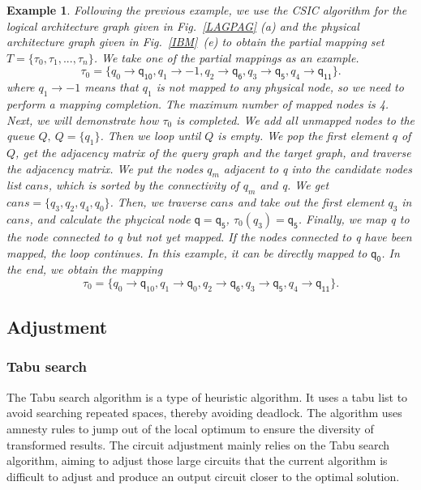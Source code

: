 \documentclass[journal]{IEEEtran}
\newtheorem{example}{Example}
\begin{document}
	\begin{example}
		Following the previous example, we use the CSIC algorithm for the logical architecture graph given in Fig.~\ref{LAGPAG} (a) and the physical architecture graph given in Fig.~\ref{IBM}~(e) to obtain the partial mapping set $T=\{\tau_{0},\tau_{1},...,\tau_{n}\}$. We take one of the partial mappings as an example.
		$$\tau_{0}=\{\textit{q}_\textit{0}\rightarrow \textsf{q}_{\textsf{10}},\textit{q}_\textit{1}\rightarrow -1,
		\textit{q}_\textit{2}\rightarrow \textsf{q}_{\textsf{6}},\textit{q}_\textit{3}\rightarrow \textsf{q}_{\textsf{5}},\textit{q}_\textit{4}\rightarrow \textsf{q}_{\textsf{11}}\}. $$ 
		where $\textit{q}_\textit{1}\rightarrow -1$ means that $\textit{q}_\textit{1}$ is not mapped to any physical node, so we need to perform a mapping completion. The maximum number of mapped nodes is 4. Next, we will demonstrate how $\tau_{0}$ is completed. We add all unmapped nodes to the queue $Q, \ Q=\{\textit{q}_\textit{1}\}$. Then we loop until $Q$ is empty. We pop the first element $q$ of $Q$, get the adjacency matrix of the query graph and the target graph, and traverse the adjacency matrix. We put the nodes  $\textit{q}_\textit{m}$ adjacent to \textit{q} into the candidate nodes list $cans$, which is sorted by the connectivity of $\textit{q}_\textit{m}$ and \textit{q}. We get $cans=\{\textit{q}_\textit{3},\textit{q}_\textit{2},\textit{q}_\textit{4},\textit{q}_\textit{0}\}$. Then, we traverse $cans$ and take out  the first element $\textit{q}_\textit{3}$ in $cans$, and calculate the phycical node $\textsf{q}=\textsf{q}_{\textsf{5}}$, $\tau_0(\textit{q}_\textit{3})=\textsf{q}_{\textsf{5}}$. Finally, we map \textit{q} to the node connected to \textsf{q} but not yet mapped. If the nodes connected to \textsf{q} have been mapped, the loop continues. In this example, it can be directly mapped to $\textsf{q}_{\textsf{0}}$. In the end, we obtain the mapping $$ \tau_{0}=\{\textit{q}_\textit{0}\rightarrow  \textsf{q}_{10},\textit{q}_\textit{1}\rightarrow \textsf{q}_{0},	\textit{q}_\textit{2}\rightarrow  \textsf{q}_{\textsf{6}},\textit{q}_\textit{3}\rightarrow  \textsf{q}_{\textsf{5}},\textit{q}_\textit{4}\rightarrow  \textsf{q}_{\textsf{11}}\}. $$
	\end{example}
	\subsection{Adjustment}
	\subsubsection{Tabu search}
	The Tabu search algorithm is a type of heuristic algorithm. It uses a tabu list to avoid searching repeated spaces, thereby avoiding deadlock. The algorithm uses amnesty rules to jump out of the local optimum to ensure the diversity of transformed results. The circuit adjustment mainly relies on the Tabu search algorithm, aiming to adjust those large circuits that the current algorithm is difficult to adjust and produce an output circuit closer to the optimal solution.
	
\end{document}
